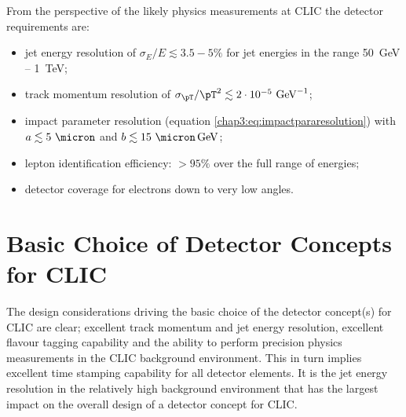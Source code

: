 From the perspective of the likely physics measurements at CLIC the detector requirements are:
\begin{itemize}
 \item jet energy resolution of $\sigma_E/E \lesssim 3.5-5\%$ for jet energies in the
 range 50~GeV -- 1~TeV;
 \item track momentum resolution of $\sigma_{\pT}/\pT^2 \lesssim
   2\cdot 10^{-5}~\textrm{GeV}^{-1}$;
 \item impact parameter resolution (equation
   \ref{chap3:eq:impactpararesolution}) with $a \lesssim 5~\micron$ and $b \lesssim 15~\micron\,\mathrm{GeV}$;
 \item lepton identification efficiency: $>95\%$ over the full range of energies; 
 \item detector coverage for electrons down to very low angles. 
\end{itemize}



\section{Basic Choice of Detector Concepts for CLIC\label{sec:chapter3:concepts}}

The design considerations driving the basic choice of the detector concept(s)
for CLIC are clear; excellent track momentum and jet energy resolution,
excellent flavour tagging capability and the ability to perform precision
physics measurements in the CLIC background environment. This in turn implies
excellent time stamping capability for all detector elements. It is the jet energy 
resolution in the relatively high background environment that
has the largest impact on the overall design of a detector concept for CLIC.

